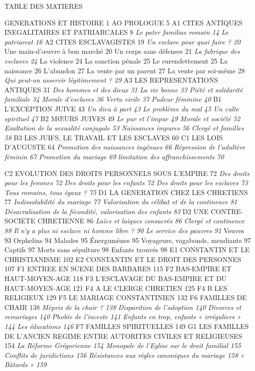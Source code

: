 TABLE DES MATIERES
 
 GENERATIONS ET HISTOIRE	1
AO PROLOGUE	5
A1 CITES ANTIQUES INEGALITAIRES ET PATRIARCALES	8
 \emph{Le pater familias romain	14}
 \emph{Le patriarcat	16}
A2 CITES ESCLAVAGISTES	19
 \emph{Un esclave pour quoi faire ?	20}
 Une main-d'œuvre à bon marché	20
 Un corps sans défenses	21
 \emph{La fabrique des esclaves	24}
 La violence	24
 La sanction pénale	25
 Le surendettement	25
 La naissance	26
 L'abandon	27
 La vente par un parent	27
 La vente par soi-même	28
 \emph{Qui peut-on asservir légitimement ?	29}
A3 LES REPRESENTATIONS ANTIQUES	31
 \emph{Des hommes et des dieux	31}
 \emph{La vie bonne	33}
 \emph{Piété et solidarité familiale	34}
 \emph{Morale d'esclaves	36}
 \emph{Vertu virile	37}
 \emph{Pudeur féminine	40}
B1 L'EXCEPTION JUIVE	43
 \emph{Un dieu à part	43}
 \emph{Le problème du mal	45}
 \emph{Un culte spirituel	47}
B2 MŒURS JUIVES	49
 \emph{Le pur et l'impur	49}
 \emph{Morale et société	52}
 \emph{Exaltation de la sexualité conjugale	53}
 \emph{Naissances impures	56}
 \emph{Clergé et familles	58}
B3 LES JUIFS, LE TRAVAIL ET LES ESCLAVES	60
C1 LES LOIS D'AUGUSTE	64
 \emph{Promotion des naissances ingénues	66}
 \emph{Répression de l'adultère féminin	67}
 \emph{Promotion du mariage	69}
 \emph{limitation des affranchissements	70
}
 
 
C2 EVOLUTION DES DROITS PERSONNELS SOUS L'EMPIRE	72
 \emph{Des droits pour les femmes	72}
 \emph{Des droits pour les enfants	72}
 \emph{Des droits pour les esclaves	73}
 \emph{Tous romains, tous égaux ?	75}
D1 LA GENERATION CHEZ LES CHRETIENS	77
 \emph{Indissolubilité du mariage	77}
 \emph{Valorisation du célibat et de la continence	81}
 \emph{Désacralisation de la fécondité, valorisation des enfants	83}
D2 UNE CONTRE-SOCIETE CHRETIENNE	86
 \emph{Laïcs et laïques consacrés	86}
 \emph{Clergé et continence	88}
 \emph{Il n'y a plus ni esclave ni homme libre ?	90}
 \emph{Le service des pauvres	91}
 Veuves	93
 Orphelins	94
 Malades	95
 Énergumènes	95
 Voyageurs, vagabonds, mendiants	97
 Captifs	97
 Morts sans sépulture	98
 Enfants trouvés	98
E1 CONSTANTIN ET LE CHRISTIANISME	102
E2 CONSTANTIN ET LE DROIT DES PERSONNES	107
F1 ENTREE EN SCENE DES BARBARES	115
F2 BAS-EMPIRE ET HAUT-MOYEN-AGE	118
F3 L'ESCLAVAGE DU BAS-EMPIRE ET DU HAUT-MOYEN-AGE	121
F4 A LE CLERGE CHRETIEN	125
F4 B LES RELIGIEUX	129
F5 LE MARIAGE CONSTANTINIEN	132
F6 FAMILLES DE CHAIR	138
 \emph{Mépris de la chair ?	138}
 \emph{Disparition de l'adoption	140}
 \emph{Divorces et remariages	140}
 \emph{Phobie de l'inceste	141}
 \emph{Enfants en trop, enfants « irréguliers »	144}
 \emph{Les éducations	146}
F7 FAMILLES SPIRITUELLES	149
G1 LES FAMILLES DE L'ANCIEN REGIME ENTRE AUTORITES CIVILES ET RELIGIEUSES	154
 \emph{La Réforme Grégorienne	154}
 \emph{Monopole de l'Eglise sur le droit familial	155}
 \emph{Conflits de juridictions	156}
 \emph{Résistances aux règles canoniques du mariage	158}
 \emph{« Bâtards »	159
}
 
